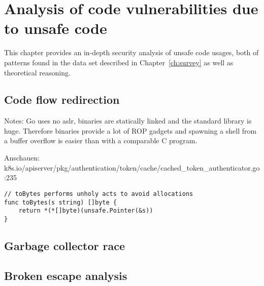 
\chapter{Analysis of code vulnerabilities due to unsafe code}\label{ch:code-vulnerabilities}

This chapter provides an in-depth security analysis of unsafe code usages, both of patterns found in the data set
described in Chapter~\ref{ch:survey} as well as theoretical reasoning.



\section{Code flow redirection}\label{sec:vulnerability-flow-redirection}

Notes: Go uses no \acrshort{aslr}, binaries are statically linked and the standard library is huge.
Therefore binaries provide a lot of ROP gadgets and spawning a shell from a buffer overflow is easier than with a
comparable C program.

Anschauen: k8s.io/apiserver/pkg/authentication/token/cache/cached_token_authenticator.go:235

\begin{lstlisting}[language=Golang, label=lst:todo-unsafe-snippet, caption=Todo: unsafe code snippet?]
// toBytes performs unholy acts to avoid allocations
func toBytes(s string) []byte {
    return *(*[]byte)(unsafe.Pointer(&s))
}
\end{lstlisting}



\section{Garbage collector race}\label{sec:vulnerability-gc-race}



\section{Broken escape analysis}\label{sec:vulnerability-escape-analysis}

